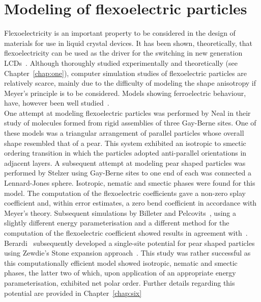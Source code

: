 

\section{Modeling of flexoelectric particles}


Flexoelectricity is an important property to be considered in the design of materials for use in 
liquid crystal devices.  It has been shown, theoretically, that flexoelectricity can be used
as the driver for the switching in new generation LCDs~\cite{DavidsonMottram02}.
Although thoroughly studied experimentally and theoretically (see Chapter~\ref{chap:one}), 
computer simulation studies of flexoelectric particles are relatively scarce, mainly
due to the difficulty of modeling the shape anisotropy if Meyer's principle is to be considered.
Models showing ferroelectric behaviour, have, however been well 
studied~\cite{WeiPatey92,WeiPatey92a}.\\

One attempt at modeling flexoelectric particles was performed by Neal
\etal\cite{NealParker97} in their study of molecules formed from rigid assemblies of 
three Gay-Berne sites. One
of these models was a triangular arrangement of parallel particles whose overall shape
resembled that of a pear. This system exhibited an isotropic to smectic ordering transition in
which the particles adopted anti-parallel orientations in adjacent layers. A subsequent
attempt at modeling pear shaped particles was performed by Stelzer \etal\cite{StelzerBerardi99}
using Gay-Berne sites to one end of each was connected a Lennard-Jones sphere.
Isotropic, nematic and smectic phases were found for this model. The computation of the
flexoelectric coefficients gave a non-zero splay coefficient and, within error estimates, a zero
bend  coefficient in accordance with Meyer's theory. Subsequent simulations by Billeter and
Pelcovits~\cite{BilleterPelcovits00}, using a slightly different energy parameterisation and a
different method for the computation of the flexoelectric coefficient showed results in
agreement with~\cite{StelzerBerardi99}.\\
Berardi~\etal\cite{BerardiRicci01} subsequently developed 
a single-site potential for pear shaped particles using Zewdie's Stone expansion
approach~\cite{Zewdie98a,Zewdie98b}. This study was rather successful as this computationally
efficient model showed
isotropic, nematic and smectic phases, the latter two of which, upon application of an appropriate
energy parameterisation, exhibited net polar order. Further details regarding this potential are
provided in Chapter~\ref{chap:six}



